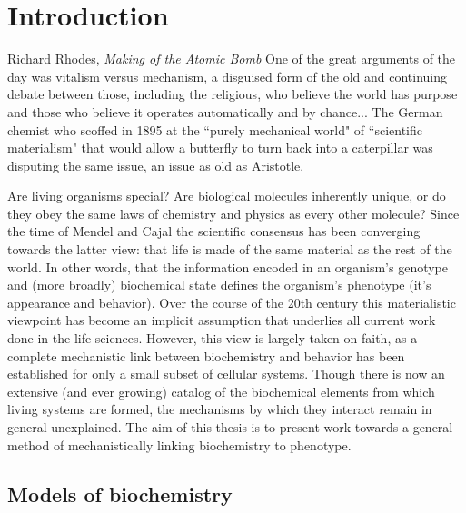 \chapter{Introduction}

\begin{chapquote}{Richard Rhodes, \textit{Making of the Atomic Bomb}\cite{Rhodes:1986ux}}
One of the great arguments of the day was vitalism versus mechanism, a disguised form of the old and continuing debate between those, including the religious, who believe the world has purpose and those who believe it operates automatically and by chance... The German chemist who scoffed in 1895 at the ``purely mechanical world" of ``scientific materialism" that would allow a butterfly to turn back into a caterpillar was disputing the same issue, an issue as old as Aristotle.
\end{chapquote}

Are living organisms special? Are biological molecules inherently unique, or do they obey the same laws of chemistry and physics as every other molecule? Since the time of Mendel\cite{Johannsen:2014iv} and Cajal\cite{hellman2001great} the scientific consensus has been converging towards the latter view: that life is made of the same material as the rest of the world. In other words, that the information encoded in an organism’s genotype and (more broadly) biochemical state defines the organism’s phenotype (\ie it’s appearance and behavior). Over the course of the 20th century this materialistic viewpoint has become an implicit assumption that underlies all current work done in the life sciences. However, this view is largely taken on faith, as a complete mechanistic link between biochemistry and behavior has been established for only a small subset of cellular systems. Though there is now an extensive (and ever growing) catalog of the biochemical elements from which living systems are formed, the mechanisms by which they interact remain in general unexplained. The aim of this thesis is to present work towards a general method of mechanistically linking biochemistry to phenotype.

\section{Models of biochemistry}

